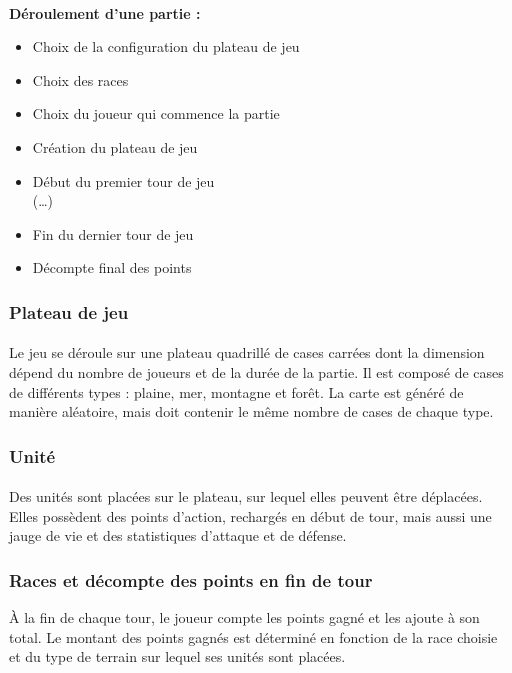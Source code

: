 \documentclass[a4paper]{article}
\begin{document}
\paragraph{}
\textbf{Déroulement d'une partie : }
\begin{itemize}
    \item Choix de la configuration du plateau de jeu
    \item Choix des races
    \item Choix du joueur qui commence la partie
    \item Création du plateau de jeu
    \item Début du premier tour de jeu\\(\dots)
    \item Fin du dernier tour de jeu
    \item Décompte final des points
\end{itemize}

\subsubsection{Plateau de jeu}
\paragraph{}
Le jeu se déroule sur une plateau quadrillé de cases carrées dont la dimension dépend du nombre de joueurs et de la durée de la partie.\label{map_gen} Il est composé de cases de différents types : plaine, mer, montagne et forêt. La carte est généré de manière aléatoire, mais doit contenir le même nombre de cases de chaque type.

\subsubsection{Unité}
\paragraph{}
Des unités sont placées sur le plateau, sur lequel elles peuvent être déplacées. Elles possèdent des points d'action, rechargés en début de tour, mais aussi une jauge de vie et des statistiques d'attaque et de défense.

\subsubsection{Races et décompte des points en fin de tour}
À la fin de chaque tour, le joueur compte les points gagné et les ajoute à son total. Le montant des points gagnés est déterminé en fonction de la race choisie et du type de terrain sur lequel ses unités sont placées.
\end{document}
